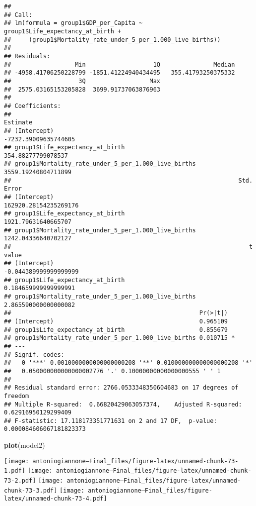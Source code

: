 \documentclass[
]{article}
\newenvironment{Shaded}{\begin{snugshade}}{\end{snugshade}}
\newcommand{\FunctionTok}[1]{\textcolor[rgb]{0.13,0.29,0.53}{\textbf{#1}}}
\newcommand{\NormalTok}[1]{#1}
\begin{document}
\begin{verbatim}
## 
## Call:
## lm(formula = group1$GDP_per_Capita ~ group1$Life_expectancy_at_birth + 
##     (group1$Mortality_rate_under_5_per_1.000_live_births))
## 
## Residuals:
##                  Min                   1Q               Median 
## -4958.41706250228799 -1851.41224940434495   355.41793250375332 
##                   3Q                  Max 
##  2575.03165153205828  3699.91737063876963 
## 
## Coefficients:
##                                                                  Estimate
## (Intercept)                                          -7232.39009635744605
## group1$Life_expectancy_at_birth                        354.88277799078537
## group1$Mortality_rate_under_5_per_1.000_live_births   3559.19240804711899
##                                                                Std. Error
## (Intercept)                                         162920.28154235269176
## group1$Life_expectancy_at_birth                       1921.79631640665707
## group1$Mortality_rate_under_5_per_1.000_live_births   1242.04336640702127
##                                                                   t value
## (Intercept)                                         -0.044389999999999999
## group1$Life_expectancy_at_birth                      0.184659999999999991
## group1$Mortality_rate_under_5_per_1.000_live_births  2.865590000000000082
##                                                     Pr(>|t|)  
## (Intercept)                                         0.965109  
## group1$Life_expectancy_at_birth                     0.855679  
## group1$Mortality_rate_under_5_per_1.000_live_births 0.010715 *
## ---
## Signif. codes:  
##   0 '***' 0.0010000000000000000208 '**' 0.010000000000000000208 '*'
##   0.050000000000000002776 '.' 0.10000000000000000555 ' ' 1
## 
## Residual standard error: 2766.0533348350604683 on 17 degrees of freedom
## Multiple R-squared:  0.66820429063057374,    Adjusted R-squared:  0.62916950129299409 
## F-statistic: 17.118173351771631 on 2 and 17 DF,  p-value: 0.000084606067181823373
\end{verbatim}

\begin{Shaded}
\begin{Highlighting}[]
\FunctionTok{plot}\NormalTok{(model2)}
\end{Highlighting}
\end{Shaded}

\texttt{[image: antoniogiannone---Final\_files/figure-latex/unnamed-chunk-73-1.pdf]}
\texttt{[image: antoniogiannone---Final\_files/figure-latex/unnamed-chunk-73-2.pdf]}
\texttt{[image: antoniogiannone---Final\_files/figure-latex/unnamed-chunk-73-3.pdf]}
\texttt{[image: antoniogiannone---Final\_files/figure-latex/unnamed-chunk-73-4.pdf]}
\end{document}
